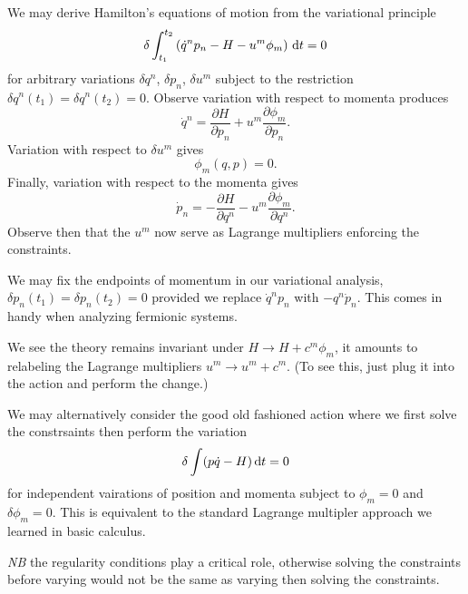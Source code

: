 \label{M:total-action-principle}
We may derive Hamilton's equations of motion from the variational
principle
\begin{equation}
\delta\int^{t_{2}}_{t_{1}}\left(\dot{q}^{n}p_{n}-H-u^{m}\phi_{m}\right)\,\mathrm{d} t=0
\end{equation}
for arbitrary variations $\delta q^{n}$, $\delta p_{n}$, $\delta u^{m}$
subject to the restriction $\delta q^{n}(t_{1})=\delta q^{n}(t_{2})=0$.
Observe variation with respect to momenta produces
\begin{equation}
  \dot{q}^{n} = \frac{\partial H}{\partial p_{n}}
  +u^{m}\frac{\partial\phi_{m}}{\partial p_{n}}.
\end{equation}
Variation with respect to $\delta u^{m}$ gives
\begin{equation}
  \phi_{m}(q,p) = 0.
\end{equation}
Finally, variation with respect to the momenta gives
\begin{equation}
\dot{p}_{n} = -\frac{\partial H}{\partial q^{n}}
  -u^{m}\frac{\partial\phi_{m}}{\partial q^{n}}.
\end{equation}
Observe
then that the $u^{m}$ now serve as Lagrange multipliers
enforcing the constraints.

We may fix the endpoints of momentum in our variational analysis,
$\delta p_{n}(t_{1})=\delta p_{n}(t_{2})=0$ provided we replace
$\dot{q}^{n}p_{n}$ with $-q^{n}\dot{p}_{n}$. This comes in handy when
analyzing fermionic systems.

\M
We see the theory remains invariant under $H\to H+c^{m}\phi_{m}$, it
amounts to relabeling the Lagrange multipliers $u^{m}\to
u^{m}+c^{m}$. (To see this, just plug it into the action and perform the
change.)

We may alternatively consider the good old fashioned action where we
first solve the constrsaints then perform the variation
\begin{equation}
\delta\int(p\dot{q}-H)\,\mathrm{d} t=0
\end{equation}
for independent vairations of position and momenta subject to
$\phi_{m}=0$ and $\delta\phi_{m}=0$. This is equivalent to the standard
Lagrange multipler approach we learned in basic calculus.

\emph{NB} the regularity conditions
play a critical role, otherwise solving the constraints before varying
would not be the same as varying then solving the constraints.

